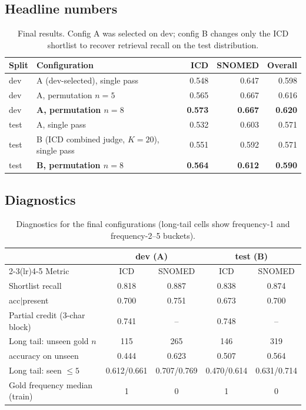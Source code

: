 \documentclass[11pt]{article}
\begin{document}
\subsection{Headline numbers}
\begin{table}[H]
\centering
\small
\begin{tabular}{@{}llrrr@{}}
\toprule
Split & Configuration & ICD & SNOMED & Overall\\
\midrule
dev & A (dev-selected), single pass & 0.548 & 0.647 & 0.598\\
dev & A, permutation $n{=}5$ & 0.565 & 0.667 & 0.616\\
dev & \textbf{A, permutation $n{=}8$} & \textbf{0.573} & \textbf{0.667} & \textbf{0.620}\\
test & A, single pass & 0.532 & 0.603 & 0.571\\
test & B (ICD combined judge, $K{=}20$), single pass & 0.551 & 0.592 & 0.571\\
test & \textbf{B, permutation $n{=}8$} & \textbf{0.564} & \textbf{0.612} & \textbf{0.590}\\
\bottomrule
\end{tabular}
\caption{Final results. Config A was selected on dev; config B changes only the ICD
shortlist to recover retrieval recall on the test distribution.}
\end{table}

\subsection{Diagnostics}
\begin{table}[H]
\centering
\small
\begin{tabular}{@{}lcccc@{}}
\toprule
 & \multicolumn{2}{c}{dev (A)} & \multicolumn{2}{c}{test (B)}\\
\cmidrule(lr){2-3}\cmidrule(lr){4-5}
Metric & ICD & SNOMED & ICD & SNOMED\\
\midrule
Shortlist recall & 0.818 & 0.887 & 0.838 & 0.874\\
acc$|$present & 0.700 & 0.751 & 0.673 & 0.700\\
Partial credit (3-char block) & 0.741 & -- & 0.748 & --\\
Long tail: unseen gold $n$ & 115 & 265 & 146 & 319\\
\quad accuracy on unseen & 0.444 & 0.623 & 0.507 & 0.564\\
Long tail: seen $\le 5$ & 0.612/0.661 & 0.707/0.769 & 0.470/0.614 & 0.631/0.714\\
Gold frequency median (train) & 1 & 0 & 1 & 0\\
\bottomrule
\end{tabular}
\caption{Diagnostics for the final configurations (long-tail cells show frequency-1 and
frequency-2--5 buckets).}
\end{table}
\end{document}
